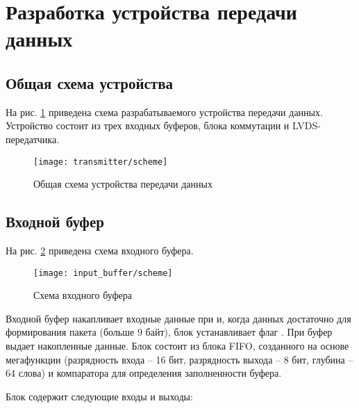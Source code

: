 \tableofcontents

\newpage

\section{Разработка устройства передачи данных}

\subsection{Общая схема устройства}

На рис. \ref{fig:transmitter-scheme} приведена схема разрабатываемого устройства передачи данных. Устройство состоит из трех входных буферов, блока коммутации и LVDS-передатчика.
\begin{figure}[H]
	\centering
	\texttt{[image: transmitter/scheme]}
	\caption{Общая схема устройства передачи данных}
	\label{fig:transmitter-scheme}
\end{figure}

\subsection{Входной буфер}

На рис. \ref{fig:input-buffer-scheme} приведена схема входного буфера.
\begin{figure}[H]
	\centering
	\texttt{[image: input\_buffer/scheme]}
	\caption{Схема входного буфера}
	\label{fig:input-buffer-scheme}
\end{figure}

Входной буфер накапливает входные данные при  и, когда данных достаточно для формирования пакета (больше 9 байт), блок устанавливает флаг . При  буфер выдает накопленные данные. Блок состоит из блока FIFO, созданного на основе мегафункции  (разрядность входа -- 16 бит, разрядность выхода -- 8 бит, глубина -- 64 слова) и компаратора для определения заполненности буфера. 

\newpage \noindent Блок содержит следующие входы и выходы:

